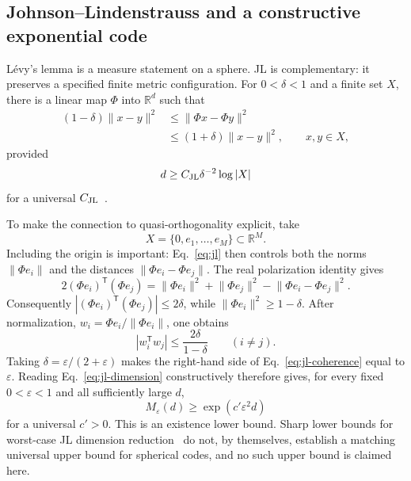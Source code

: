 \documentclass[
  aps,
  reprint,
  superscriptaddress,
  floatfix,
  nofootinbib,
  longbibliography
]{revtex4-2}
\newcommand{\R}{\mathbb{R}}
\newcommand{\Msem}{M}
\newcommand{\T}{^{\mathsf{T}}}
\newcommand{\norm}[1]{\lVert #1 \rVert}
\begin{document}
\subsection{Johnson--Lindenstrauss and a constructive exponential code}
\label{sec:jl}

L\'evy's lemma is a measure statement on a sphere.  JL is complementary: it
preserves a specified finite metric configuration.  For
$0<\delta<1$ and a finite set $X$, there is a linear map
$\Phi$ into $\R^d$ such that
\begin{equation}
\label{eq:jl}
\begin{aligned}
(1-\delta)\norm{x-y}^2
&\leq\norm{\Phi x-\Phi y}^2\\
&\leq(1+\delta)\norm{x-y}^2,
\qquad x,y\in X,
\end{aligned}
\end{equation}
provided
\begin{equation}
\label{eq:jl-dimension}
d\geq C_{\rm JL}\delta^{-2}\log |X|
\end{equation}
for a universal $C_{\rm JL}$~\cite{johnson-1984,Dasgupta-2003}.

To make the connection to quasi-orthogonality explicit, take
\[
X=\{0,e_1,\ldots,e_{\Msem}\}\subset\R^{\Msem}.
\]
Including the origin is important: Eq.~\eqref{eq:jl} then controls both the
norms $\norm{\Phi e_i}$ and the distances
$\norm{\Phi e_i-\Phi e_j}$.  The real
polarization identity gives
\begin{equation}
\label{eq:polarization}
2(\Phi e_i)\T(\Phi e_j)
=\norm{\Phi e_i}^2+\norm{\Phi e_j}^2
-\norm{\Phi e_i-\Phi e_j}^2.
\end{equation}
Consequently $|(\Phi e_i)\T(\Phi e_j)|\leq2\delta$, while
$\norm{\Phi e_i}^2\geq1-\delta$.  After normalization,
$w_i=\Phi e_i/\norm{\Phi e_i}$, one obtains
\begin{equation}
\label{eq:jl-coherence}
|w_i\T w_j|
\leq\frac{2\delta}{1-\delta}
\qquad(i\ne j).
\end{equation}
Taking $\delta=\varepsilon/(2+\varepsilon)$ makes the right-hand side of
Eq.~\eqref{eq:jl-coherence} equal to $\varepsilon$.  Reading
Eq.~\eqref{eq:jl-dimension} constructively therefore gives, for every fixed
$0<\varepsilon<1$ and all sufficiently large $d$,
\begin{equation}
\label{eq:jl-inverse}
M_\varepsilon(d)
\geq
\exp(c'\varepsilon^2d)
\end{equation}
for a universal $c'>0$.  This is an existence lower bound.  Sharp lower bounds for worst-case JL
dimension reduction~\cite{alon2016optimal,larsen-nelson-2017} do not, by
themselves, establish a matching universal upper bound for spherical codes,
and no such upper bound is claimed here.
\end{document}
